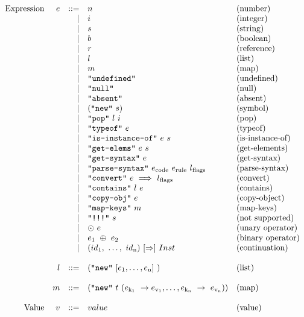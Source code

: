 \documentclass[acmsmall,screen]{acmart}
\newcommand{\Cd}[1]{\texttt{#1}}
\newcommand{\primitive}[1]{ \Cd{#1}}
\newcommand{\subsc}[2]{#1\textsubscript{#2}}
\begin{document}
\[
\begin{array}{rrrll}
\text{Expression} & e & ::= & n & \text{(number)}\\
&&|& i & \text{(integer)}\\
&&|& s & \text{(string)}\\
&&|& b & \text{(boolean)}\\
&&|& r & \text{(reference)}\\
&&|& l & \text{(list)}\\
&&|& m & \text{(map)}\\
&&|& \primitive{"undefined"} & \text{(undefined)}\\
&&|& \primitive{"null"} & \text{(null)}\\
&&|& \primitive{"absent"} & \text{(absent)}\\
&&|& (\Cd{"new"}\ s) & \text{(symbol)}\\ %
&&|& \Cd{"pop"}\ l\ i & \text{(pop)}\\
&&|& \Cd{"typeof"}\ e& \text{(typeof)}\\
&&|& \Cd{"is-instance-of"}\ e\ s& \text{(is-instance-of)}\\
&&|& \Cd{"get-elems"}\ e\ s& \text{(get-elements)}\\
&&|& \Cd{"get-syntax"}\ e& \text{(get-syntax)}\\
&&|& \Cd{"parse-syntax"}\ \subsc{e}{code}\ \subsc{e}{rule}\ 
\subsc{l}{flags}& \text{(parse-syntax)}\\
&&|& \Cd{"convert"}\ e\ \Longrightarrow \ \subsc{l}{flags}& \text{(convert)}\\
&&|& \Cd{"contains"}\ l\ e& \text{(contains)}\\
&&|& \Cd{"copy-obj"}\ e& \text{(copy-object)}\\
&&|& \Cd{"map-keys"}\ m& \text{(map-keys)}\\
&&|& \Cd{"!!!"}\ s& \text{(not supported)}\\
&&|& \odot\ e& \text{(unary operator)}\\ %
&&|& \subsc{e}{1}\ \oplus\ \subsc{e}{2}& \text{(binary operator)}\\ %
&&|& (\subsc{id}{1},\ \dots,\ \subsc{id}{n})\ [\Rightarrow]\ Inst
& \text{(continuation)}\\ %
\\

& l & ::= & (\Cd{"new"}\ [\subsc{e}{1},\dots,\subsc{e}{n}]\ )
& \text{(list)}\\
\\

& m & ::= & (\Cd{"new"}\ t\
(\subsc{e}{\subsc{k}{1}}\ \to \subsc{e}{\subsc{v}{1}}, \dots
, \subsc{e}{\subsc{k}{n}}\ \to\ \subsc{e}{\subsc{v}{n}}))
& \text{(map)}\\
\\

\text{Value} & v & ::= & value & \text{(value)}\\
\\
\end{array}
\]
\end{document}
